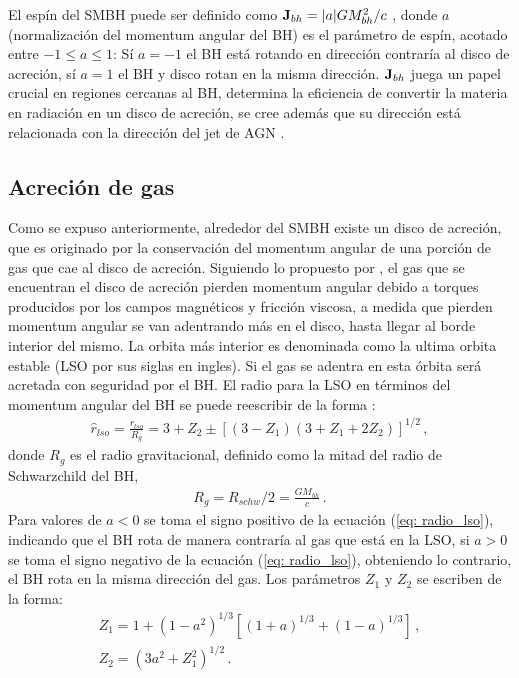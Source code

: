 El espín del SMBH puede ser definido como ${\bf{J}}_{bh}=|a|GM^{2}_{bh}/c$ \cite{fanidakis2011}, donde $a$ (normalización del momentum angular del BH) es el parámetro de espín, acotado entre $-1\leq a \leq 1$: Sí $a=-1$ el BH está rotando en dirección contraría al disco de acreción, sí $a=1$ el BH y disco rotan en la misma dirección. 
${\bf{J}}_{bh}$ juega un papel crucial en regiones cercanas al BH, determina la eficiencia de convertir la materia en radiación en un disco de acreción, se cree además que su dirección está relacionada con la dirección del jet de AGN \cite{fanidakis2011}. 

\subsection{Acreción de gas}
\label{subsec: Acrecion_gas}
Como se expuso anteriormente, alrededor del SMBH existe un disco de acreción, que es originado por la conservación del momentum angular de una porción de gas  que cae al disco de acreción. Siguiendo lo propuesto por \cite{lynden1969}, el gas que se encuentran el disco de acreción pierden momentum angular debido a torques producidos por los campos magnéticos y fricción viscosa, a medida que pierden momentum angular se van adentrando más en el disco, hasta llegar al borde interior del mismo. La orbita más interior es denominada como la ultima orbita estable (LSO por sus siglas en ingles). Si el gas se adentra en esta órbita será acretada con seguridad por el BH. El radio para la LSO en términos del momentum angular del BH se puede reescribir de la forma \cite{bardeen1972}:
%
\begin{align}
 \hat{r}_{lso}=\frac{r_{lso}}{R_g}=3+Z_{2}\pm \left[ (3-Z_{1})(3+Z_{1}+2Z_{2})\right]^{1/2} \,,
 \label{eq: radio_lso}
\end{align}
%
donde $R_{g}$ es el radio gravitacional, definido como la mitad del radio de Schwarzchild del BH, 
%
\begin{align}
    R_{g}= R_{schw}/2  = \frac{GM_{bh}}{c}\,.
\end{align}
%
Para valores de $a<0$ se toma el signo positivo de la ecuación (\ref{eq: radio_lso}), indicando que el BH rota de manera contraría al gas que está en la LSO, si $a>0$ se toma el signo negativo de la ecuación (\ref{eq: radio_lso}), obteniendo lo contrario, el BH rota en la misma dirección del gas. Los parámetros $Z_1$ y $Z_2$ se escriben de la forma:
%
\begin{eqnarray}
    Z_1 = 1+(1-a^{2})^{1/3}\left[(1+a)^{1/3}+(1-a)^{1/3} \right]\,,\\
    Z_2 = (3a^{2}+Z_{1}^{2})^{1/2}\,.
\end{eqnarray}
